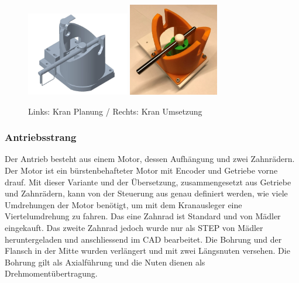 \documentclass[../../main.tex]{subfiles}
\begin{document}
        \begin{figure}[H]
            \centering
            \includegraphics[width=0.4\textwidth]{WuerfelaufnahmeBG.JPG}
            \hspace{1.5cm}
            \includegraphics[width=0.35\textwidth]{Kran/Testaufbau.JPG}
            \caption {Links: Kran Planung / Rechts: Kran Umsetzung}
        \end{figure}



    \subsubsection{Antriebsstrang}
        Der Antrieb besteht aus einem Motor, dessen Aufhängung und zwei Zahnrädern. Der Motor ist ein bürstenbehafteter
        Motor mit Encoder und Getriebe vorne drauf. Mit dieser Variante und der Übersetzung, zusammengesetzt aus Getriebe
        und Zahnrädern, kann von der Steuerung aus genau definiert werden, wie viele Umdrehungen der Motor benötigt, um
        mit dem Kranausleger eine Viertelumdrehung zu fahren. Das eine Zahnrad ist Standard und von Mädler eingekauft.
        Das zweite Zahnrad jedoch wurde nur als STEP von Mädler heruntergeladen und anschliessend im CAD bearbeitet. Die
        Bohrung und der Flansch in der Mitte wurden verlängert und mit zwei Längsnuten versehen. Die Bohrung gilt als
        Axialführung und die Nuten dienen als Drehmomentübertragung.
 
\end{document}
